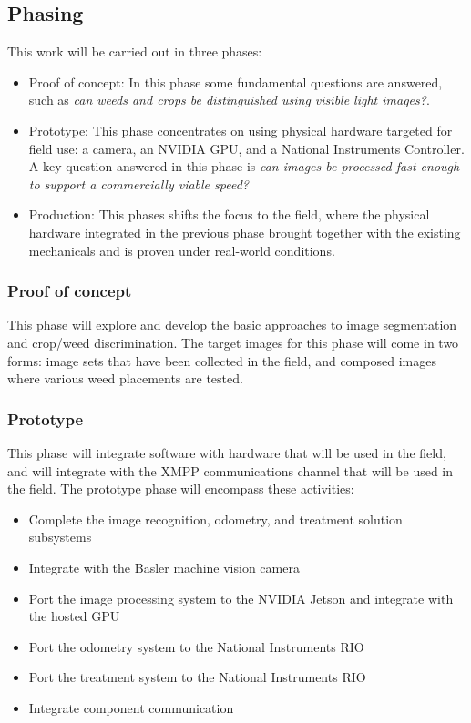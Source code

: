 \documentclass[12pt]{article}
\begin{document}
{\subsection{Phasing}
This work will be carried out in three phases:
\begin{itemize}
\item{Proof of concept: In this phase some fundamental questions are answered, such as \textit{can weeds and crops be distinguished using visible light images?}}.
\item{Prototype: This phase concentrates on using physical hardware targeted for field use: a camera, an NVIDIA GPU, and a National Instruments Controller. A key question answered in this phase is \textit{can images be processed fast enough to support a commercially viable speed?}}
\item{Production: This phases shifts the focus to the field, where the physical hardware integrated in the previous phase brought together with the existing mechanicals and is proven under real-world conditions.} 
\end{itemize}

\subsubsection{Proof of concept}
This phase will explore and develop the basic approaches to image segmentation and crop/weed discrimination. The target images for this phase will come in two forms: image sets that have been collected in the field, and composed images where various weed placements are tested.
\subsubsection{Prototype}
This phase will integrate software with hardware that will be used in the field, and will integrate with the XMPP communications channel that will be used in the field. The prototype phase will encompass these activities: \\
\begin{itemize}
	\item{Complete the image recognition, odometry, and treatment solution subsystems}
	\item{Integrate with the Basler machine vision camera}
	\item{Port the image processing system to the NVIDIA Jetson and integrate with the hosted GPU}
	\item{Port the odometry system to the National Instruments RIO}
	\item{Port the treatment system to the National Instruments RIO}
	\item{Integrate component communication}
\end{itemize}
}
\end{document}
